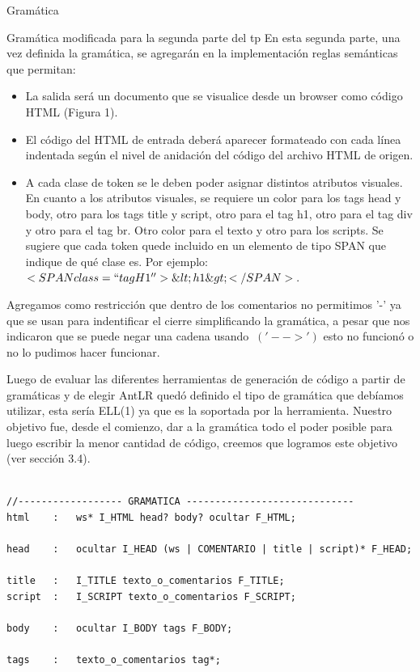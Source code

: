\documentclass[a4paper,8pt]{article}
\begin{document}
\begin{section}{Gramática}
\begin{subsection}{Gramática modificada para la segunda parte del tp}
En esta segunda parte, una vez definida la gramática, se agregarán en la implementación reglas semánticas que permitan:\\
\begin{itemize}
 \item La salida será un documento que se visualice desde un browser como código HTML (Figura 1).
\item El código del HTML de entrada deberá aparecer formateado con cada línea indentada según el nivel de anidación del código del archivo HTML de origen. 
\item A cada clase de token se le deben poder asignar distintos atributos visuales. En cuanto a los atributos visuales, se requiere un color para los tags head y body, otro para los tags title y script, otro para el tag h1, otro para el tag div y otro para el tag br. Otro color para el texto y otro para los scripts.
Se sugiere que cada token quede incluido en un elemento de tipo SPAN que indique de qué clase es.
Por ejemplo:$<SPAN class=``tagH1''>\&lt;h1\&gt;</SPAN>.$

\end{itemize}
Agregamos como restricción que dentro de los comentarios no permitimos '-' ya que se usan para indentificar el cierre simplificando la gramática, a pesar que nos indicaron que se puede negar una cadena usando $~('-->')$ esto no funcionó o no lo pudimos hacer funcionar.

Luego de evaluar las diferentes herramientas de generación de código a partir de gramáticas y de elegir AntLR quedó definido el tipo de gramática que debíamos utilizar, esta sería ELL(1) ya que es la soportada por la herramienta.
Nuestro objetivo fue, desde el comienzo, dar a la gramática todo el poder posible para luego escribir la menor cantidad de código, creemos que logramos este objetivo (ver sección 3.4).

\bigskip

\begin{verbatim}
  
//------------------ GRAMATICA -----------------------------
html 	:	ws* I_HTML head? body? ocultar F_HTML;

head 	:	ocultar I_HEAD (ws | COMENTARIO | title | script)* F_HEAD;

title 	:	I_TITLE texto_o_comentarios F_TITLE;
script 	:	I_SCRIPT texto_o_comentarios F_SCRIPT;

body 	:	ocultar I_BODY tags F_BODY;

tags	:	texto_o_comentarios tag*;


\end{verbatim}
\end{subsection}
\end{section}
\end{document}
